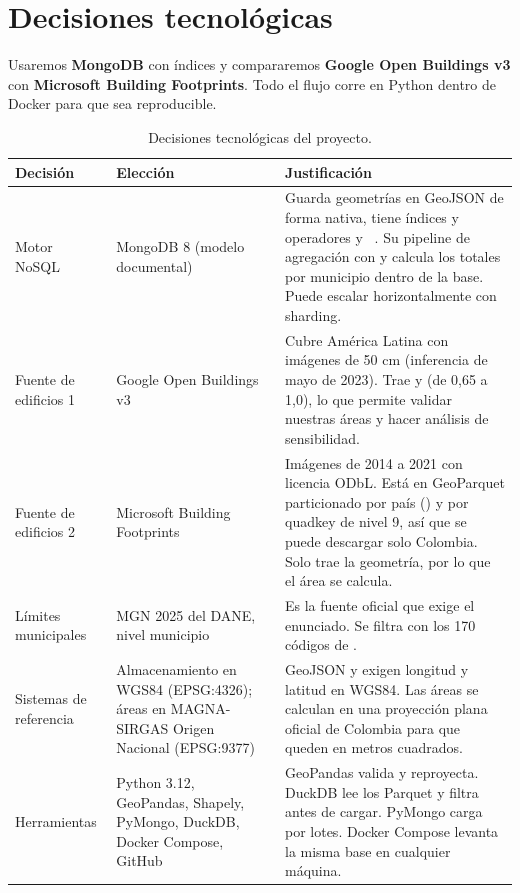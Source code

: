 \section{Decisiones tecnológicas}
\label{sec:decisiones}

Usaremos \textbf{MongoDB} con índices  y compararemos
\textbf{Google Open Buildings v3} con \textbf{Microsoft Building Footprints}.
Todo el flujo corre en Python dentro de Docker para que sea reproducible.

\begin{table}[H]
\centering
\small
\caption{Decisiones tecnológicas del proyecto.}
\label{tab:decisiones}
\begin{tabularx}{\textwidth}{@{}p{2.6cm}p{3.6cm}L@{}}
\toprule
\textbf{Decisión} & \textbf{Elección} & \textbf{Justificación} \\
\midrule
Motor NoSQL & MongoDB 8 (modelo documental) &
  Guarda geometrías en GeoJSON de forma nativa, tiene índices 
  y operadores  y ~\cite{mongodb}.
  Su pipeline de agregación con  y  calcula los
  totales por municipio dentro de la base. Puede escalar horizontalmente con
  sharding. \\
Fuente de edificios 1 & Google Open Buildings v3~\cite{google} &
  Cubre América Latina con imágenes de 50 cm (inferencia de mayo de 2023).
  Trae  y  (de 0,65 a 1,0), lo que
  permite validar nuestras áreas y hacer análisis de sensibilidad. \\
Fuente de edificios 2 & Microsoft Building Footprints~\cite{microsoft} &
  Imágenes de 2014 a 2021 con licencia ODbL. Está en GeoParquet particionado
  por país () y por quadkey de nivel 9, así que se puede
  descargar solo Colombia. Solo trae la geometría, por lo que el área se
  calcula. \\
Límites municipales & MGN 2025 del DANE, nivel municipio~\cite{mgn} &
  Es la fuente oficial que exige el enunciado. Se filtra con los 170 códigos
  de . \\
Sistemas de referencia & Almacenamiento en WGS84 (EPSG:4326); áreas en
  MAGNA-SIRGAS Origen Nacional (EPSG:9377) &
  GeoJSON y  exigen longitud y latitud en WGS84. Las áreas se
  calculan en una proyección plana oficial de Colombia para que queden en
  metros cuadrados. \\
Herramientas & Python 3.12, GeoPandas, Shapely, PyMongo, DuckDB, Docker
  Compose, GitHub &
  GeoPandas valida y reproyecta. DuckDB lee los Parquet y filtra antes de
  cargar. PyMongo carga por lotes. Docker Compose levanta la misma base en
  cualquier máquina. \\
\bottomrule
\end{tabularx}
\end{table}

